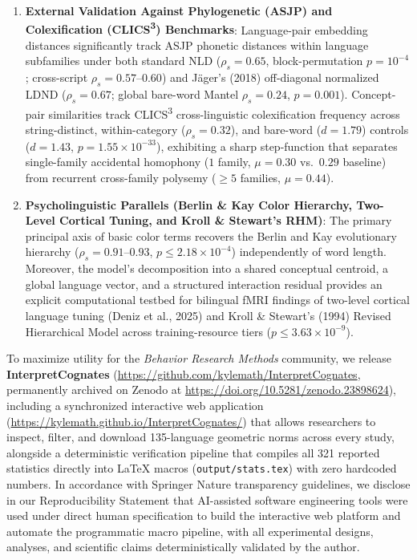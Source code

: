 \documentclass[11pt,a4paper]{article}
\begin{document}
\begin{enumerate}
  \item \textbf{External Validation Against Phylogenetic (ASJP) and Colexification (CLICS\textsuperscript{3}) Benchmarks}: Language-pair embedding distances significantly track ASJP phonetic distances within language subfamilies under both standard NLD ($\rho_s = 0.65$, block-permutation $p = 10^{-4}$; cross-script $\rho_s = 0.57\text{--}0.60$) and J\"ager's (2018) off-diagonal normalized LDND ($\rho_s = 0.67$; global bare-word Mantel $\rho_s = 0.24$, $p = 0.001$). Concept-pair similarities track CLICS\textsuperscript{3} cross-linguistic colexification frequency across string-distinct, within-category ($\rho_s = 0.32$), and bare-word ($d = 1.79$) controls ($d = 1.43$, $p = 1.55 \times 10^{-33}$), exhibiting a sharp step-function that separates single-family accidental homophony ($1$ family, $\mu = 0.30$ vs.\ $0.29$ baseline) from recurrent cross-family polysemy ($\ge 5$ families, $\mu = 0.44$).
  \item \textbf{Psycholinguistic Parallels (Berlin \& Kay Color Hierarchy, Two-Level Cortical Tuning, and Kroll \& Stewart's RHM)}: The primary principal axis of basic color terms recovers the Berlin and Kay evolutionary hierarchy ($\rho_s = 0.91\text{--}0.93$, $p \le 2.18 \times 10^{-4}$) independently of word length. Moreover, the model's decomposition into a shared conceptual centroid, a global language vector, and a structured interaction residual provides an explicit computational testbed for bilingual fMRI findings of two-level cortical language tuning (Deniz et al., 2025) and Kroll \& Stewart's (1994) Revised Hierarchical Model across training-resource tiers ($p \le 3.63 \times 10^{-9}$).
\end{enumerate}

To maximize utility for the \textit{Behavior Research Methods} community, we release \textbf{InterpretCognates} (\url{https://github.com/kylemath/InterpretCognates}, permanently archived on Zenodo at \url{https://doi.org/10.5281/zenodo.23898624}), including a synchronized interactive web application (\url{https://kylemath.github.io/InterpretCognates/}) that allows researchers to inspect, filter, and download 135-language geometric norms across every study, alongside a deterministic verification pipeline that compiles all 321 reported statistics directly into LaTeX macros (\texttt{output/stats.tex}) with zero hardcoded numbers. In accordance with Springer Nature transparency guidelines, we disclose in our Reproducibility Statement that AI-assisted software engineering tools were used under direct human specification to build the interactive web platform and automate the programmatic macro pipeline, with all experimental designs, analyses, and scientific claims deterministically validated by the author.
\end{document}

